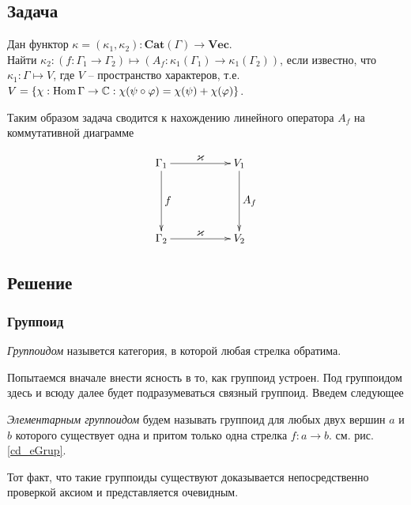 \subsection*{Задача}
    Дан функтор $\kappa = (\kappa_1, \kappa_2): \mathbf{Cat}(\Gamma) \to 
    \mathbf{Vec}$.\\
    Найти $\kappa_2 : (f: \Gamma_1 \to \Gamma_2) \mapsto 
    (A_f: \kappa_1(\Gamma_1) \to \kappa_1(\Gamma_2))$, если известно, что 
    $\kappa_1 : \Gamma \mapsto V$, где $V$ -- пространство характеров, т.е. 
    $V = \{\chi: \operatorname*{Hom} \Gamma \to \mathbb{C}: \chi(\psi \circ \varphi) = 
    \chi(\psi) + \chi(\varphi)\}$.

    Таким образом задача сводится к нахождению линейного оператора $A_f$ на 
    коммутативной диаграмме

    \begin{equation}\label{cd_problem}
    \xymatrix{
        \Gamma_1 \ar[dd]^{\textstyle{f}} \ar[rr]^{\textstyle{\kappa}} & & V_1 \ar[dd]^{\textstyle{A_f}} \\
                                            & & \\
        \Gamma_2 \ar[rr]^{\textstyle{\kappa}}           & & V_2
    }
    \end{equation}

\subsection*{Решение}

\subsubsection{Группоид}
    \begin{definition}\cite{MacLane}
        \emph{Группоидом} назывется категория, в которой любая стрелка обратима.
    \end{definition}

    Попытаемся вначале внести ясность в то, как группоид устроен. Под 
    группоидом здесь и всюду далее будет подразумеваться связный группоид. 
    Введем следующее
    \begin{definition}
        \emph{Элементарным группоидом} будем называть группоид для любых двух 
        вершин $a$ и $b$ которого существует одна и притом только одна стрелка 
        $f: a \to b$. см. рис. \ref{cd_eGrup}.
    \end{definition}
    Тот факт, что такие группоиды существуют доказывается непосредственно 
    проверкой аксиом и представляется очевидным.

